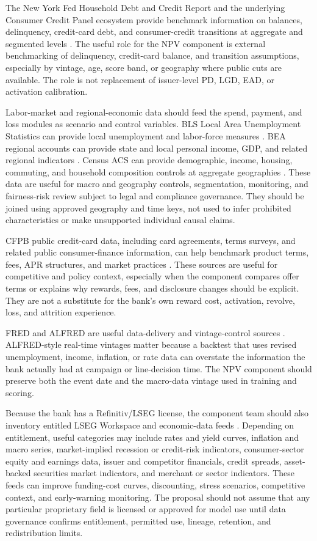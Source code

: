 \documentclass[11pt]{article}
\newcommand{\1}{\mathbf{1}}
\begin{document}
The New York Fed Household Debt and Credit Report and the underlying Consumer
Credit Panel ecosystem provide benchmark information on balances, delinquency,
credit-card debt, and consumer-credit transitions at aggregate and segmented
levels \citep{nyfedHhdc}. The useful role for the NPV component is external
benchmarking of delinquency, credit-card balance, and transition assumptions,
especially by vintage, age, score band, or geography where public cuts are
available. The role is not replacement of issuer-level PD, LGD, EAD, or
activation calibration.

Labor-market and regional-economic data should feed the spend, payment, and
loss modules as scenario and control variables. BLS Local Area Unemployment
Statistics can provide local unemployment and labor-force measures
\citep{blsLAUS}. BEA regional accounts can provide state and local personal
income, GDP, and related regional indicators \citep{beaRegional}. Census ACS
can provide demographic, income, housing, commuting, and household composition
controls at aggregate geographies \citep{censusACS}. These data are useful for
macro and geography controls, segmentation, monitoring, and fairness-risk
review subject to legal and compliance governance. They should be joined using
approved geography and time keys, not used to infer prohibited characteristics
or make unsupported individual causal claims.

CFPB public credit-card data, including card agreements, terms surveys, and
related public consumer-finance information, can help benchmark product terms,
fees, APR structures, and market practices \citep{cfpbCreditCardData}. These
sources are useful for competitive and policy context, especially when the
component compares offer terms or explains why rewards, fees, and disclosure
changes should be explicit. They are not a substitute for the bank's own reward
cost, activation, revolve, loss, and attrition experience.

FRED and ALFRED are useful data-delivery and vintage-control sources
\citep{fredALFRED}. ALFRED-style real-time vintages matter because a backtest
that uses revised unemployment, income, inflation, or rate data can overstate
the information the bank actually had at campaign or line-decision time. The
NPV component should preserve both the event date and the macro-data vintage
used in training and scoring.

Because the bank has a Refinitiv/LSEG license, the component team should also
inventory entitled LSEG Workspace and economic-data feeds
\citep{lsegWorkspace,lsegEconomicData}. Depending on entitlement, useful
categories may include rates and yield curves, inflation and macro series,
market-implied recession or credit-risk indicators, consumer-sector equity and
earnings data, issuer and competitor financials, credit spreads, asset-backed
securities market indicators, and merchant or sector indicators. These feeds
can improve funding-cost curves, discounting, stress scenarios, competitive
context, and early-warning monitoring. The proposal should not assume that any
particular proprietary field is licensed or approved for model use until data
governance confirms entitlement, permitted use, lineage, retention, and
redistribution limits.
\end{document}
